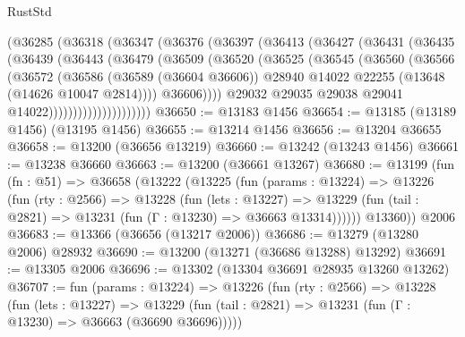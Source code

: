 \begin{lexlean}{RustStd}
\begin{coremodule}
                  (@36285
                    (@36318
                      (@36347
                        (@36376
                          (@36397
                            (@36413
                              (@36427
                                (@36431
                                  (@36435
                                    (@36439
                                      (@36443
                                        (@36479
                                          (@36509
                                            (@36520
                                              (@36525
                                                (@36545
                                                  (@36560
                                                    (@36566
                                                      (@36572
                                                        (@36586
                                                          (@36589 (@36604 @36606))
                                                          @28940
                                                          @14022
                                                          @22255
                                                          (@13648 (@14626 @10047 @2814))))
                                                      @36606))))
                                              @29032
                                              @29035
                                              @29038
                                              @29041
                                              @14022)))))))))))))))))))))
@36650 := @13183 @1456
@36654 := @13185 (@13189 @1456) (@13195 @1456)
@36655 := @13214 @1456
@36656 := @13204 @36655
@36658 := @13200 (@36656 @13219)
@36660 := @13242 (@13243 @1456)
@36661 := @13238 @36660
@36663 := @13200 (@36661 @13267)
@36680 := @13199
    (fun (fn : @51) =>
    @36658
      (@13222
        (@13225
          (fun (params : @13224) =>
          @13226
            (fun (rty : @2566) =>
            @13228
              (fun (lets : @13227) =>
              @13229 (fun (tail : @2821) => @13231 (fun (Γ : @13230) => @36663 @13314))))))
        @13360))
    @2006
@36683 := @13366 (@36656 (@13217 @2006))
@36686 := @13279 (@13280 @2006) @28932
@36690 := @13200 (@13271 (@36686 @13288) @13292)
@36691 := @13305 @2006
@36696 := @13302 (@13304 @36691 @28935 @13260 @13262)
@36707 := fun (params : @13224) =>
  @13226
    (fun (rty : @2566) =>
    @13228
      (fun (lets : @13227) =>
      @13229 (fun (tail : @2821) => @13231 (fun (Γ : @13230) => @36663 (@36690 @36696)))))

\end{coremodule}
\end{lexlean}
